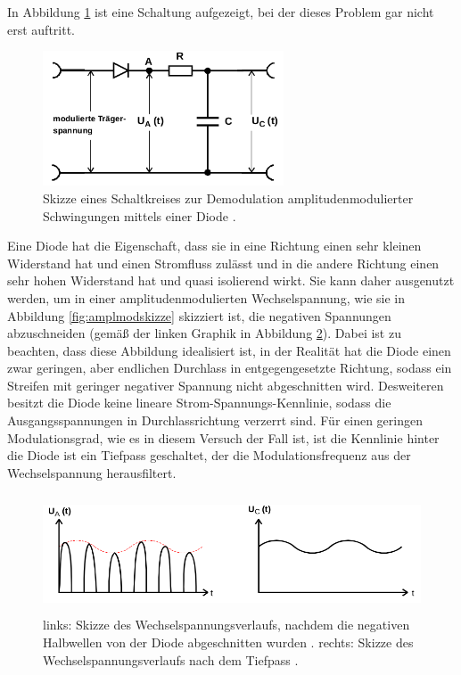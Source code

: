 In Abbildung \ref{fig:ampldemodschaltung2} ist eine Schaltung aufgezeigt, bei der dieses Problem gar nicht erst auftritt.

\begin{figure}
  \centering
  \includegraphics[height=4cm]{JasperErsterSchultag/ampldemodschaltung2.png}
  \caption{Skizze eines Schaltkreises zur Demodulation amplitudenmodulierter Schwingungen mittels einer Diode \cite{anleitung}.}
  \label{fig:ampldemodschaltung2}
\end{figure}

Eine Diode hat die Eigenschaft, dass sie in eine Richtung einen sehr kleinen Widerstand hat und einen Stromfluss zulässt und in die
andere Richtung einen sehr hohen Widerstand hat und quasi isolierend wirkt. Sie kann daher ausgenutzt werden, um in einer amplitudenmodulierten
Wechselspannung, wie sie in Abbildung \ref{fig:amplmodskizze} skizziert ist, die negativen Spannungen abzuschneiden (gemäß der linken Graphik in
Abbildung \ref{fig:diodetiefpass}). Dabei ist zu beachten, dass diese Abbildung idealisiert ist, in der Realität hat die Diode einen zwar geringen, aber
endlichen Durchlass in entgegengesetzte Richtung, sodass ein Streifen mit geringer negativer Spannung nicht abgeschnitten wird.
Desweiteren besitzt die Diode keine lineare Strom-Spannungs-Kennlinie, sodass die Ausgangsspannungen in Durchlassrichtung verzerrt sind.
Für einen geringen Modulationsgrad, wie es in diesem Versuch der Fall ist, ist die Kennlinie
hinter die Diode ist ein Tiefpass geschaltet, der die Modulationsfrequenz aus der Wechselspannung herausfiltert.

\begin{figure}
  \centering
  \includegraphics[height=3.5cm]{JasperErsterSchultag/diodetiefpass.png}
  \caption{links: Skizze des Wechselspannungsverlaufs, nachdem die negativen Halbwellen von der Diode abgeschnitten wurden \cite{anleitung}.
  rechts: Skizze des Wechselspannungsverlaufs nach dem Tiefpass \cite{anleitung}.}
  \label{fig:diodetiefpass}
\end{figure}

